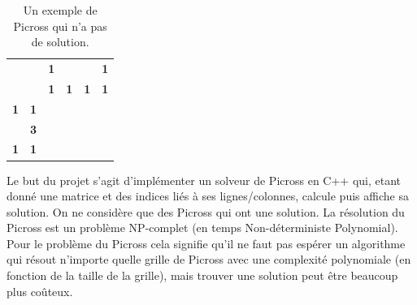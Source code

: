 \documentclass{article}
\begin{document}
\begin{table}[h]
\centering
\begin{tabular}{cccccc}
                   &                                 & \textbf{1}                                                           & \textbf{}                                     & \textbf{}                                     & \textbf{1}                                                           \\
                   & \textbf{}                       & \textbf{1}                                                           & \textbf{1}                                    & \textbf{1}                                    & \textbf{1}                                                           \\ \cline{3-6} 
\textbf{1}         & \multicolumn{1}{c|}{\textbf{1}} & \multicolumn{1}{c|}{\cellcolor[HTML]{000000}}                        & \multicolumn{1}{c|}{}                         & \multicolumn{1}{c|}{}                         & \multicolumn{1}{c|}{\cellcolor[HTML]{000000}}                        \\ \cline{3-6} 
\textit{\textbf{}} & \multicolumn{1}{c|}{\textbf{3}} & \multicolumn{1}{c|}{\cellcolor[HTML]{C0C0C0}{\color[HTML]{9B9B9B} }} & \multicolumn{1}{c|}{\cellcolor[HTML]{000000}} & \multicolumn{1}{c|}{\cellcolor[HTML]{000000}} & \multicolumn{1}{c|}{\cellcolor[HTML]{C0C0C0}{\color[HTML]{9B9B9B} }} \\ \cline{3-6} 
\textbf{1}         & \multicolumn{1}{c|}{\textbf{1}} & \multicolumn{1}{c|}{\cellcolor[HTML]{000000}}                        & \multicolumn{1}{c|}{}                         & \multicolumn{1}{c|}{}                         & \multicolumn{1}{c|}{\cellcolor[HTML]{000000}}                        \\ \cline{3-6} 
\end{tabular}
\caption{Un exemple de Picross qui n'a pas de solution.}
\end{table}
\newpage


Le but du projet s'agit d'impl\'ementer un solveur de Picross en C++ qui, etant donné une matrice et des indices liés à ses lignes/colonnes, calcule puis affiche sa solution. On ne consid\`ere que des Picross qui ont une solution.\newline
La r\'esolution du Picross est un probl\`eme NP-complet (en temps Non-déterministe Polynomial). Pour le probl\`eme du Picross cela signifie qu'il ne faut pas esp\'erer un algorithme qui r\'esout n'importe quelle grille de Picross avec une complexit\'e polynomiale (en fonction de la taille de la grille), mais trouver une solution peut être beaucoup plus coûteux.
\end{document}
